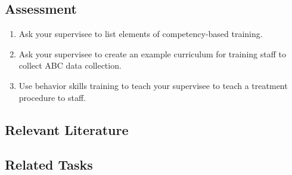 \subsection{Assessment}
\begin{enumerate}
\item Ask your supervisee to list elements of competency-based training. 
\item Ask your supervisee to create an example curriculum for training staff to collect ABC data collection.
\item Use behavior skills training to teach your supervisee to teach a treatment procedure to staff. 
%
\end{enumerate}
%
\subsection{Relevant Literature}
\begin{refsection}
\nocite{test,alang2017police,clayton2018black}
\printbibliography[heading=none]
\end{refsection} 
%
\subsection{Related Tasks}
\fourdFour{}\\
\fourdFive{}\\
\foureThree{}\\
\fourfThree{}\\
\fourkTwo{}\\
%
%
%
%
%
%
